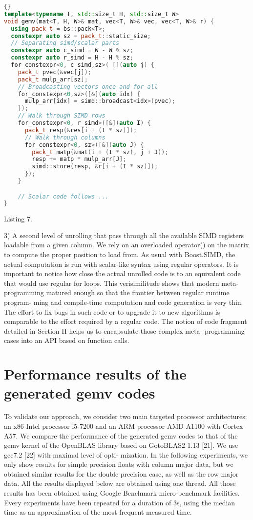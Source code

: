 \documentclass[../../main.tex]{subfiles}
\begin{document}
\begin{lstlisting}[language=c++, caption=Unrolled gemv kernel]{}
template<typename T, std::size_t H, std::size_t W>
void gemv(mat<T, H, W>& mat, vec<T, W>& vec, vec<T, W>& r) {
  using pack_t = bs::pack<T>;
  constexpr auto sz = pack_t::static_size;
  // Separating simd/scalar parts
  constexpr auto c_simd = W - W % sz;
  constexpr auto r_simd = H - H % sz;
  for_constexpr<0, c_simd,sz>( [](auto j) {
    pack_t pvec(&vec[j]);
    pack_t mulp_arr[sz];
    // Broadcasting vectors once and for all
    for_constexpr<0,sz>([&](auto idx) {
      mulp_arr[idx] = simd::broadcast<idx>(pvec);
    });
    // Walk through SIMD rows
    for_constexpr<0, r_simd>([&](auto I) {
      pack_t resp(&res[i + (I * sz)]);
      // Walk through columns
      for_constexpr<0, sz>([&](auto J) {
        pack_t matp(&mat(i + (I * sz), j + J));
        resp += matp * mulp_arr[J];
        simd::store(resp, &r[i + (I * sz)]);
      });
    }

    // Scalar code follows ...
}
\end{lstlisting}
Listing 7.

3) A second level of unrolling that pass through all the
available SIMD registers loadable from a given column.
We rely on an overloaded operator() on the matrix
to compute the proper position to load from. As usual
with Boost.SIMD, the actual computation is run with
scalar-like syntax using regular operators.
It is important to notice how close the actual unrolled code
is to an equivalent code that would use regular for loops. This
verisimilitude shows that modern meta-programming matured
enough so that the frontier between regular runtime program-
ming and compile-time computation and code generation is
very thin. The effort to fix bugs in such code or to upgrade
it to new algorithms is comparable to the effort required
by a regular code. The notion of code fragment detailed
in Section II helps us to encapsulate those complex meta-
programming cases into an API based on function calls.

\section{Performance results of the generated gemv codes}

To validate our approach, we consider two main targeted
processor architectures: an x86 Intel processor i5-7200 and an
ARM processor AMD A1100 with Cortex A57. We compare
the performance of the generated gemv codes to that of the
gemv kernel of the OpenBLAS library based on GotoBLAS2
1.13 [21]. We use gcc7.2 [22] with maximal level of opti-
mization. In the following experiments, we only show results
for simple precision floats with column major data, but we
obtained similar results for the double precision case, as well
as the row major data. All the results displayed below are
obtained using one thread. All those results has been obtained
using Google Benchmark micro-benchmark facilities. Every
experiments have been repeated for a duration of 3s, using
the median time as an approximation of the most frequent
measured time.
\end{document}
